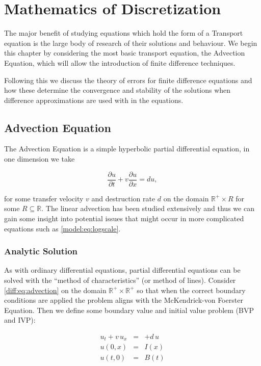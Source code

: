 \documentclass[../main.tex]{subfiles}
\begin{document}
  \chapter{Mathematics of Discretization}\label{chapter:fdes}
  The major benefit of studying equations which hold the form of a Transport equation is the large body of research of their solutions and behaviour. We begin this chapter by considering the most basic transport equation, the Advection Equation, which will allow the introduction of finite difference techniques.

  Following this we discuss the theory of errors for finite difference equations and how these determine the convergence and stability of the solutions when difference approximations are used with in the equations.

  \section{Advection Equation}
  The Advection Equation is a simple hyperbolic partial differential equation, in one dimension we take

  \begin{equation} \label{diff:eq:advection}
    \frac{\partial u}{\partial t} + v \frac{\partial u}{\partial x} = d u,
  \end{equation}

  for some transfer velocity $v$ and destruction rate $d$ on the domain $\mathbb{R}^+ \times R$ for some $R \subseteq \mathbb{R}$. The linear advection has been studied extensively and thus we can gain some insight into potential issues that might occur in more complicated equations such as \autoref{model:eq:logscale}.

  \subsection{Analytic Solution}
  As with ordinary differential equations, partial differential equations can be solved with the ``method of characteristics'' (or method of lines). Consider \autoref{diff:eq:advection} on the domain $\mathbb{R}^+ \times \mathbb{R}^+$ so that when the correct boundary conditions are applied the problem aligns with the McKendrick-von Foerster Equation. Then we define some boundary value and initial value problem (BVP and IVP):

  \begin{eqnarray} \label{diff:eq:advectionbvp}
    u_t + v \, u_x  &=& + d \, u \nonumber \\
    u(0, x) &=& I(x) \nonumber \\
    u(t, 0) &=& B(t)
  \end{eqnarray}
\end{document}
